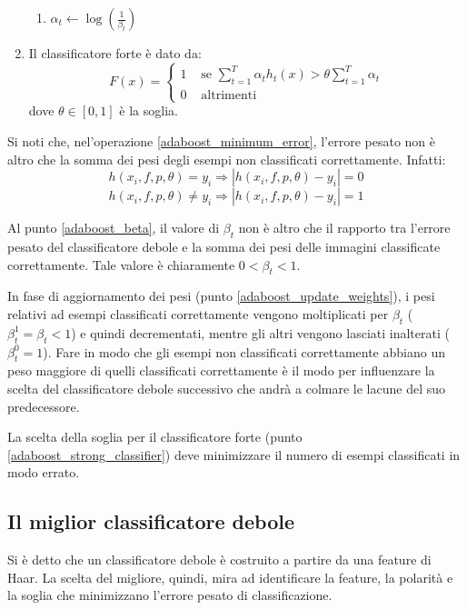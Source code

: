 \begin{enumerate}
\begin{enumerate}
                    \item $\alpha_t \leftarrow \log(\frac{1}{\beta_t})$
                \end{enumerate}

            \item \label{adaboost_strong_classifier} Il classificatore forte è dato da:
            \begin{equation}
                F(x) = \begin{cases}
                    1 & \text{ se } \sum_{t = 1}^{T} \alpha_t h_t(x) > \theta \sum_{t = 1}^{T} \alpha_t \\
                    0 & \text{ altrimenti }
                \end{cases}
            \end{equation}
            dove $\theta \in [0,1]$ è la soglia.
        \end{enumerate}

        Si noti che, nel'operazione \ref{adaboost_minimum_error}, l'errore pesato non è altro che la somma dei pesi degli esempi non classificati correttamente. Infatti:
        $$ h(x_i, f, p, \theta) = y_i \Rightarrow |h(x_i, f, p, \theta) - y_i| = 0 $$
        $$ h(x_i, f, p, \theta) \neq y_i \Rightarrow |h(x_i, f, p, \theta) - y_i| = 1 $$

        Al punto \ref{adaboost_beta}, il valore di $\beta_t$ non è altro che il rapporto tra l'errore pesato del classificatore debole e la somma dei pesi delle immagini classificate correttamente. Tale valore è chiaramente $0 < \beta_t < 1$.

        In fase di aggiornamento dei pesi (punto \ref{adaboost_update_weights}), i pesi relativi ad esempi classificati correttamente vengono moltiplicati per $\beta_t$ ($\beta_{t}^{1} = \beta_t < 1$) e quindi decrementati, mentre gli altri vengono lasciati inalterati ($\beta_{t}^{0} = 1$). Fare in modo che gli esempi non classificati correttamente abbiano un peso maggiore di quelli classificati correttamente è il modo per influenzare la scelta del classificatore debole successivo che andrà a colmare le lacune del suo predecessore.

        La scelta della soglia per il classificatore forte (punto \ref{adaboost_strong_classifier}) deve minimizzare il numero di esempi classificati in modo errato.


    \subsection{Il miglior classificatore debole} %
    \label{sub:il_miglior_classificatore_debole}
        Si è detto che un classificatore debole è costruito a partire da una feature di Haar. La scelta del migliore, quindi, mira ad identificare la feature, la polarità e la soglia che minimizzano l'errore pesato di classificazione.

